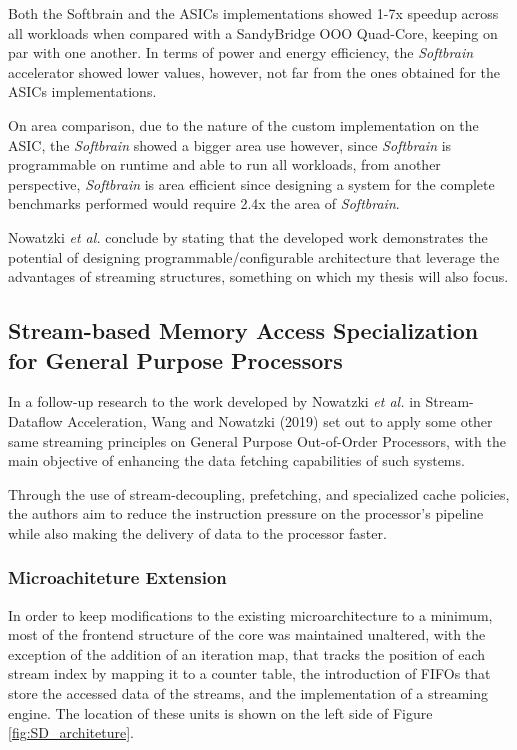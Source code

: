 Both the Softbrain and the ASICs implementations showed 1-7x speedup across all workloads when compared with a SandyBridge OOO Quad-Core, keeping on par with one another. In terms of power and energy efficiency, the \textit{Softbrain} accelerator showed lower values, however, not far from the ones obtained for the ASICs implementations. 

On area comparison, due to the nature of the custom implementation on the ASIC, the \textit{Softbrain} showed a bigger area use however, since \textit{Softbrain} is programmable on runtime and able to run all workloads, from another perspective, \textit{Softbrain} is area efficient since designing a system for the complete benchmarks performed would require 2.4x the area of \textit{Softbrain}.

Nowatzki \textit{et al.} \cite{8192490} conclude by stating that the developed work demonstrates the potential of designing programmable/configurable architecture that leverage the advantages of streaming structures, something on which my thesis will also focus.


\subsection{Stream-based Memory Access Specialization for General Purpose Processors}

In a follow-up research to the work developed by Nowatzki \textit{et al.} in Stream-Dataflow Acceleration\cite{8192490}, Wang and Nowatzki (2019) \cite{8980305} set out to apply some other same streaming principles on General Purpose Out-of-Order Processors, with the main objective of enhancing the data fetching capabilities of such systems.

Through the use of stream-decoupling, prefetching, and specialized cache policies, the authors aim to reduce the instruction pressure on the processor's pipeline while also making the delivery of data to the processor faster.

\subsubsection{Microachiteture Extension}
In order to keep modifications to the existing microarchitecture to a minimum, most of the frontend structure of the core was maintained unaltered, with the exception of the addition of an iteration map, that tracks the position of each stream index by mapping it to a counter table, the introduction of FIFOs that store the accessed data of the streams, and the implementation of a streaming engine. The location of these units is shown on the left side of Figure \ref{fig:SD_architeture}.

